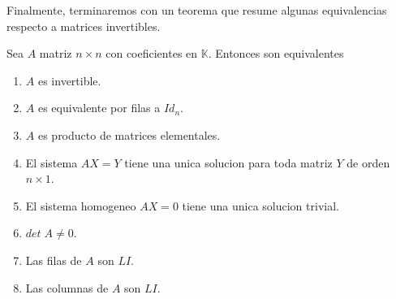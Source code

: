 \documentclass{article}
\theoremstyle{definition}
\theoremstyle{definition}
\theoremstyle{remark}
\begin{document}
Finalmente, terminaremos con un teorema que resume algunas equivalencias respecto a matrices invertibles. 
\begin{teo}
Sea $A$ matriz $n \times n$ con coeficientes en $\mathbb{K}$. Entonces son equivalentes \begin{enumerate}[label=(\arabic*)]
  \item $A$ es invertible. 
  \item $A$ es equivalente por filas a $Id_n$. 
  \item $A$ es producto de matrices elementales. 
  \item El sistema $AX=Y$ tiene una unica solucion para toda matriz $Y$ de orden $n \times 1$. 
  \item El sistema homogeneo $AX=0$ tiene una unica solucion trivial. 
  \item $det \; A \neq 0$. 
  \item Las filas de $A$ son $LI$.
  \item Las columnas de $A$ son $LI$.
\end{enumerate}
\end{teo}
\pagebreak
\end{document}
